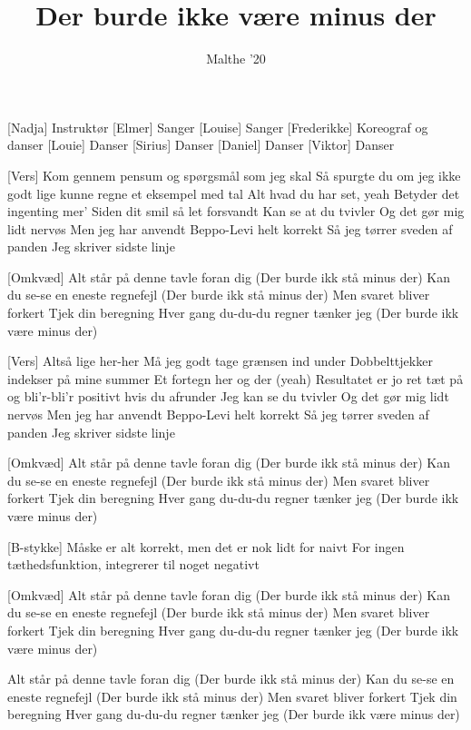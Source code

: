 \documentclass[a4paper, 11pt]{article}
\title{Der burde ikke være minus der}
\author{Malthe '20}
\begin{document}
\maketitle

\begin{roles}  
[Nadja] Instruktør
[Elmer] Sanger
[Louise] Sanger
[Frederikke] Koreograf og danser
[Louie] Danser
[Sirius] Danser
[Daniel] Danser
[Viktor] Danser
\end{roles}

\begin{song}

[Vers] Kom gennem pensum og spørgsmål som jeg skal
Så spurgte du om jeg ikke godt lige kunne regne et eksempel med tal
Alt hvad du har set, yeah
Betyder det ingenting mer’
Siden dit smil så let forsvandt
Kan se at du tvivler
Og det gør mig lidt nervøs
Men jeg har anvendt Beppo-Levi helt korrekt
Så jeg tørrer sveden af panden
Jeg skriver sidste linje

[Omkvæd] Alt står på denne tavle foran dig
(Der burde ikk stå minus der)
Kan du se-se en eneste regnefejl
(Der burde ikk stå minus der)
Men svaret bliver forkert
Tjek din beregning
Hver gang du-du-du regner tænker jeg
(Der burde ikk være minus der)

[Vers] Altså lige her-her
Må jeg godt tage grænsen ind under
Dobbelttjekker indekser på mine summer
Et fortegn her og der (yeah)
Resultatet er jo ret tæt på og bli’r-bli’r positivt hvis du afrunder
Jeg kan se du tvivler
Og det gør mig lidt nervøs
Men jeg har anvendt Beppo-Levi helt korrekt
Så jeg tørrer sveden af panden
Jeg skriver sidste linje

[Omkvæd] Alt står på denne tavle foran dig
(Der burde ikk stå minus der)
Kan du se-se en eneste regnefejl
(Der burde ikk stå minus der)
Men svaret bliver forkert
Tjek din beregning
Hver gang du-du-du regner tænker jeg
(Der burde ikk være minus der)

[B-stykke] Måske er alt korrekt, men det er nok lidt for naivt
For ingen tæthedsfunktion, integrerer til noget negativt

[Omkvæd] Alt står på denne tavle foran dig
(Der burde ikk stå minus der)
Kan du se-se en eneste regnefejl
(Der burde ikk stå minus der)
Men svaret bliver forkert
Tjek din beregning
Hver gang du-du-du regner tænker jeg
(Der burde ikk være minus der)

Alt står på denne tavle foran dig
(Der burde ikk stå minus der)
Kan du se-se en eneste regnefejl
(Der burde ikk stå minus der)
Men svaret bliver forkert
Tjek din beregning
Hver gang du-du-du regner tænker jeg
(Der burde ikk være minus der)










\end{song}
\end{document}
